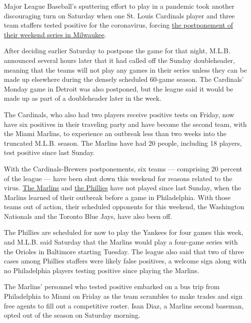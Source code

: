 Major League Baseball's sputtering effort to play in a pandemic took
another discouraging turn on Saturday when one St. Louis Cardinals
player and three team staffers tested positive for the coronavirus,
forcing
\href{https://www.nytimes.com/2020/07/31/sports/baseball/cardinals-twins-coronavirus-mlb.html}{the
postponement of their weekend series in Milwaukee}.

After deciding earlier Saturday to postpone the game for that night,
M.L.B. announced several hours later that it had called off the Sunday
doubleheader, meaning that the teams will not play any games in their
series unless they can be made up elsewhere during the densely scheduled
60-game season. The Cardinals' Monday game in Detroit was also
postponed, but the league said it would be made up as part of a
doubleheader later in the week.

The Cardinals, who also had two players receive positive tests on
Friday, now have six positives in their traveling party and have become
the second team, with the Miami Marlins, to experience an outbreak less
than two weeks into the truncated M.L.B. season. The Marlins have had 20
people, including 18 players, test positive since last Sunday.

With the Cardinals-Brewers postponements, six teams --- comprising 20
percent of the league --- have been shut down this weekend for reasons
related to the virus.
\href{https://www.nytimes.com/2020/07/28/sports/baseball/marlins-outbreak-mlb-coronavirus.html}{The
Marlins} and
\href{https://www.nytimes.com/2020/07/30/sports/baseball/phillies-blue-jays-postponed-coronavirus.html}{the
Phillies} have not played since last Sunday, when the Marlins learned of
their outbreak before a game in Philadelphia. With those teams out of
action, their scheduled opponents for this weekend, the Washington
Nationals and the Toronto Blue Jays, have also been off.

The Phillies are scheduled for now to play the Yankees for four games
this week, and M.L.B. said Saturday that the Marlins would play a
four-game series with the Orioles in Baltimore starting Tuesday. The
league also said that two of three cases among Phillies staffers were
likely false positives, a welcome sign along with no Philadelphia
players testing positive since playing the Marlins.

The Marlins' personnel who tested positive embarked on a bus trip from
Philadelphia to Miami on Friday as the team scrambles to make trades and
sign free agents to fill out a competitive roster. Isan Diaz, a Marlins
second baseman, opted out of the season on Saturday morning.

